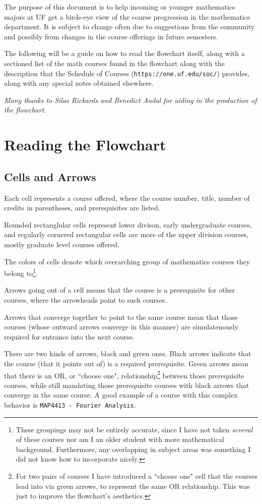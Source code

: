 \documentclass[11pt]{article}
\begin{document}
The purpose of this document is to help incoming or younger mathematics majors at UF get a birds-eye view of the course progression in the mathematics department. It is subject to change often due to suggestions from the community and possibly from changes in the course offerings in future semesters.

The following will be a guide on how to read the flowchart itself, along with a sectioned list of the math courses found in the flowchart along with the description that the Schedule of Courses (\texttt{https://one.uf.edu/soc/}) provides, along with any special notes obtained elsewhere.

\textit{Many thanks to Silas Rickards and Benedict Andal for aiding in the production of the flowchart.}

\section{Reading the Flowchart}

\subsection{Cells and Arrows}
Each cell represents a course offered, where the course number, title, number of credits in parentheses, and prerequisites are listed. 

Rounded rectanglular cells represent lower divison, early undergraduate courses, and regularly cornered rectangular cells are more of the upper division courses, mostly graduate level courses offered. 

The colors of cells denote which overarching group of mathematics courses they belong to\footnote{These groupings may not be entirely accurate, since I have not taken \textit{several} of these courses nor am I an older student with more mathematical background. Furthermore, any overlapping in subject areas was something I did not know how to incorporate nicely.}.

Arrows going out of a cell means that the course is a prerequisite for other courses, where the arrowheads point to such courses.

Arrows that converge together to point to the same course mean that those courses (whose outward arrows converge in this manner) are simulatenously required for entrance into the next course.

There are two kinds of arrows, black and green ones. Black arrows indicate that the course (that it points out of) is a required prerequisite. Green arrows mean that there is an OR, or ``choose one", relationship\footnote{For two pairs of courses I have introduced a ``choose one" cell that the courses lead into via green arrows, to represent the same OR relationship. This was just to improve the flowchart's aesthetics.} between those prerequisite courses, while still mandating those prerequisite courses with black arrows that converge in the same course. A good example of a course with this complex behavior is \texttt{MAP4413 - Fourier Analysis}.
\end{document}
